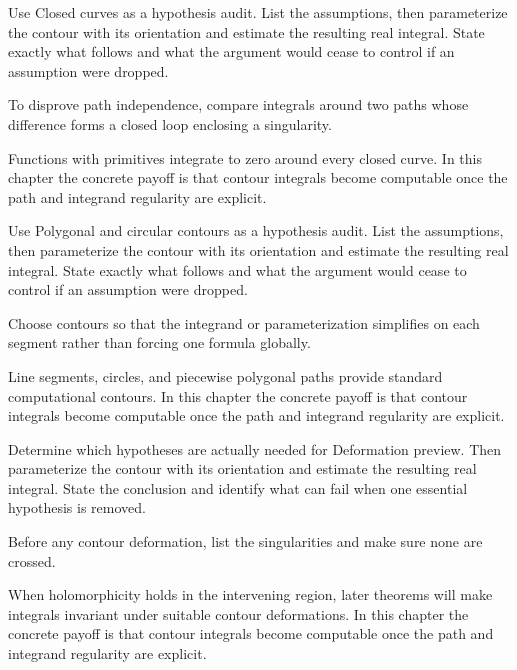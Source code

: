 \begin{exercise}\label{exr:iv04-06}
Use Closed curves as a hypothesis audit. List the assumptions, then parameterize the contour with its orientation and estimate the resulting real integral. State exactly what follows and what the argument would cease to control if an assumption were dropped.
\end{exercise}
\begin{hint}
To disprove path independence, compare integrals around two paths whose difference forms a closed loop enclosing a singularity.
\end{hint}
\begin{solution}
Functions with primitives integrate to zero around every closed curve. In this chapter the concrete payoff is that contour integrals become computable once the path and integrand regularity are explicit.
\end{solution}

\begin{exercise}\label{exr:iv04-07}
Use Polygonal and circular contours as a hypothesis audit. List the assumptions, then parameterize the contour with its orientation and estimate the resulting real integral. State exactly what follows and what the argument would cease to control if an assumption were dropped.
\end{exercise}
\begin{hint}
Choose contours so that the integrand or parameterization simplifies on each segment rather than forcing one formula globally.
\end{hint}
\begin{solution}
Line segments, circles, and piecewise polygonal paths provide standard computational contours. In this chapter the concrete payoff is that contour integrals become computable once the path and integrand regularity are explicit.
\end{solution}

\begin{exercise}\label{exr:iv04-08}
Determine which hypotheses are actually needed for Deformation preview. Then parameterize the contour with its orientation and estimate the resulting real integral. State the conclusion and identify what can fail when one essential hypothesis is removed.
\end{exercise}
\begin{hint}
Before any contour deformation, list the singularities and make sure none are crossed.
\end{hint}
\begin{solution}
When holomorphicity holds in the intervening region, later theorems will make integrals invariant under suitable contour deformations. In this chapter the concrete payoff is that contour integrals become computable once the path and integrand regularity are explicit.
\end{solution}

